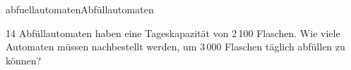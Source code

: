 \begin{exercise}{abfuellautomaten}{Abfüllautomaten}
  \ifproblem\problem\par
    14 Abfüllautomaten haben eine Tageskapazität von 2\,100 Flaschen. Wie viele
    Automaten müssen nachbestellt werden, um 3\,000 Flaschen täglich abfüllen zu
    können?
  \fi
\end{exercise}
